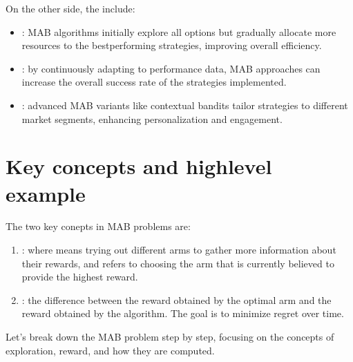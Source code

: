 \documentclass[letterpaper,10pt,english]{jupyterBook}
\begin{document}
\sphinxAtStartPar
On the other side, the  include:
\begin{itemize}
\item {} 
\sphinxAtStartPar
{}: MAB algorithms initially explore all options but gradually allocate more resources to the best\sphinxhyphen{}performing strategies, improving overall efficiency.

\item {} 
\sphinxAtStartPar
{}: by continuously adapting to performance data, MAB approaches can increase the overall success rate of the strategies implemented.

\item {} 
\sphinxAtStartPar
{}: advanced MAB variants like contextual bandits tailor strategies to different market segments, enhancing personalization and engagement.

\end{itemize}


\section{Key concepts and high\sphinxhyphen{}level example}
\label{\detokenize{notebooks/bandits:key-concepts-and-high-level-example}}
\sphinxAtStartPar
The two key conepts in MAB problems are:
\begin{enumerate}
%
\item {} 
\sphinxAtStartPar
{}: where  means trying out different arms to gather more information about their rewards, and  refers to choosing the arm that is currently believed to provide the highest reward.

\item {} 
\sphinxAtStartPar
{}: the difference between the reward obtained by the optimal arm and the reward obtained by the algorithm. The goal is to minimize regret over time.

\end{enumerate}

\sphinxAtStartPar
Let’s break down the MAB problem step by step, focusing on the concepts of exploration, reward, and how they are computed.

\sphinxAtStartPar
{}
\end{document}

